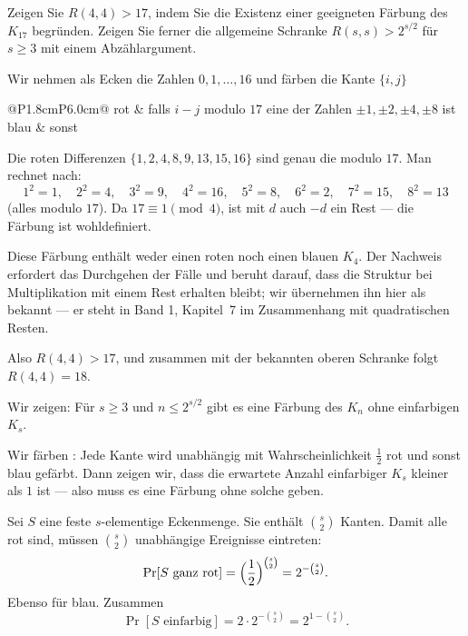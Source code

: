 \begin{aufgabe}
Zeigen Sie $R(4,4) > 17$, indem Sie die Existenz einer geeigneten Färbung des $K_{17}$ begründen. Zeigen Sie ferner die allgemeine Schranke $R(s,s) > 2^{s/2}$ für $s \ge 3$ mit einem Abzählargument.

\loesung
{}
Wir nehmen als Ecken die Zahlen $0, 1, \ldots, 16$ und färben die Kante $\{i,j\}$
\begin{center}
\renewcommand{\arraystretch}{1.5}
\begin{tabular}{@{}P{1.8cm}P{6.0cm}@{}}
\toprule
\textcolor{akzent}{rot} & falls $i-j$ modulo $17$ eine der Zahlen $\pm1, \pm2, \pm4, \pm8$ ist\\
\textcolor{mittel}{blau} & sonst\\
\bottomrule
\end{tabular}
\end{center}

Die roten Differenzen $\{1,2,4,8,9,13,15,16\}$ sind genau die  modulo $17$. Man rechnet nach:
\[ 1^2 = 1,\quad 2^2 = 4,\quad 3^2 = 9,\quad 4^2 = 16,\quad 5^2 = 8,\quad 6^2 = 2,\quad 7^2 = 15,\quad 8^2 = 13 \]
(alles modulo $17$). Da $17 \equiv 1 \pmod 4$, ist mit $d$ auch $-d$ ein Rest --- die Färbung ist wohldefiniert.

Diese Färbung enthält weder einen roten noch einen blauen $K_4$. Der Nachweis erfordert das Durchgehen der Fälle und beruht darauf, dass die Struktur bei Multiplikation mit einem Rest erhalten bleibt; wir übernehmen ihn hier als bekannt --- er steht in Band 1, Kapitel~7 im Zusammenhang mit quadratischen Resten.

Also $R(4,4) > 17$, und zusammen mit der bekannten oberen Schranke folgt $R(4,4) = 18$.

Wir zeigen: Für $s \ge 3$ und $n \le 2^{s/2}$ gibt es eine Färbung des $K_n$ ohne einfarbigen $K_s$.

Wir färben : Jede Kante wird unabhängig mit Wahrscheinlichkeit $\tfrac12$ rot und sonst blau gefärbt. Dann zeigen wir, dass die erwartete Anzahl einfarbiger $K_s$ kleiner als $1$ ist --- also muss es eine Färbung ohne solche geben.

Sei $S$ eine feste $s$-elementige Eckenmenge. Sie enthält $\binom{s}{2}$ Kanten. Damit alle rot sind, müssen $\binom{s}{2}$ unabhängige Ereignisse eintreten:
\[ \Pr[S \text{ ganz rot}] = \Bigl(\frac12\Bigr)^{\binom{s}{2}} = 2^{-\binom{s}{2}} . \]
Ebenso für blau. Zusammen
\[ \Pr[S \text{ einfarbig}] = 2 \cdot 2^{-\binom{s}{2}} = 2^{1-\binom{s}{2}} . \]


\end{aufgabe}
